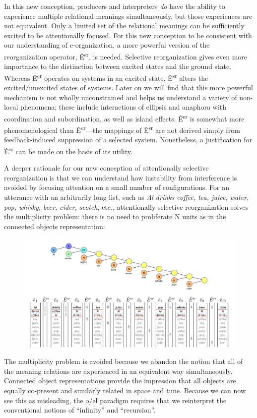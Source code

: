   In this new conception, producers and interpreters \textit{do} have the ability to experience multiple relational meanings simultaneously, but those experiences are not equivalent. Only a limited set of the relational meanings can be sufficiently excited to be attentionally focused. For this new conception to be consistent with our understanding of e-organization, a more powerful version of the reorganization operator, Ê\textsuperscript{sr},  is needed. Selective reorganization gives even more importance to the distinction between excited states and the ground state. Whereas Ê\textsuperscript{cr} operates on systems in an excited state, Ê\textsuperscript{sr} alters the excited/unexcited states of systems. Later on we will find that this more powerful mechanism is not wholly unconstrained and helps us understand a variety of non-local phenomena; these include interactions of ellipsis and anaphora with coordination and subordination, as well as island effects. Ê\textsuperscript{sr} is somewhat more phenomenological than Ê\textsuperscript{cr}—the mappings of Ê\textsuperscript{sr} are not derived simply from feedback-induced suppression of a selected system. Nonetheless, a justification for Ê\textsuperscript{sr} can be made on the basis of its utility.

  A deeper rationale for our new conception of attentionally selective reorganization is that we can understand how instability from interference is avoided by focusing attention on a small number of configurations.  For an utterance with an arbitrarily long list, such as \textit{Al drinks coffee, tea, juice, water, pop, whisky, beer, cider, scotch}, etc., attentionally selective reorganization solves the multiplicity problem: there is no need to proliferate N units as in the connected objects representation: 

  
\begin{figure}
\includegraphics[width=\textwidth]{figures/Tilsen-img104.png}
\caption{\missingcaption}
\label{fig:4:54}
\end{figure}
 

  The multiplicity problem is avoided because we abandon the notion that all of the meaning relations are experienced in an equivalent way simultaneously. Connected object representations provide the impression that all objects are equally co-present and similarly related in space and time. Because we can now see this as misleading, the o/el paradigm requires that we reinterpret the conventional notions of “infinity” and “recursion”.

